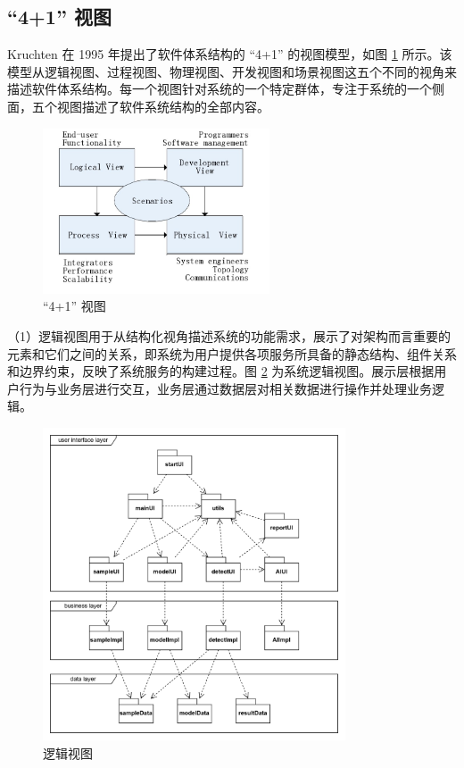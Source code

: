 \documentclass[
  ]{njuthesis}
\begin{document}
\subsection{“4+1” 视图}

Kruchten 在 1995 年提出了软件体系结构的 “4+1” 的视图模型，如图 \ref{4+1视图} 所示。该模型从逻辑视图、过程视图、物理视图、开发视图和场景视图这五个不同的视角来描述软件体系结构。每一个视图针对系统的一个特定群体，专注于系统的一个侧面，五个视图描述了软件系统结构的全部内容\cite{[11]}。

\begin{figure}[htb]
    \centering
    \includegraphics[width=0.6\textwidth]{images/4+1视图.png}
    \caption{“4+1” 视图}
    \label{4+1视图}
\end{figure}

（1）逻辑视图用于从结构化视角描述系统的功能需求，展示了对架构而言重要的元素和它们之间的关系，即系统为用户提供各项服务所具备的静态结构、组件关系和边界约束，反映了系统服务的构建过程。图 \ref{逻辑视图} 为系统逻辑视图。展示层根据用户行为与业务层进行交互，业务层通过数据层对相关数据进行操作并处理业务逻辑。

\begin{figure}[H]
    \centering
    \includegraphics[width=0.8\textwidth]{images/逻辑视图.png}
    \caption{逻辑视图}
    \label{逻辑视图}
\end{figure}
\end{document}
